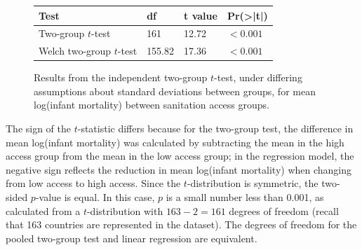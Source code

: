 

\begin{figure}[ht]
	\centering
	\begin{tabular}{llll}
		\hline
		Test & df & t value & Pr(>|t|) \\ 
		\hline
		Two-group $t$-test & 161 & 12.72 & $< 0.001$ \\ 
		Welch two-group $t$-test & 155.82 & 17.36 & $< 0.001$ \\
		\hline
	\end{tabular}
	\caption{Results from the independent two-group $t$-test, under differing assumptions about standard deviations between groups, for mean log(infant mortality) between sanitation access groups.} 
	\label{tTestSanitStd}
\end{figure}



The sign of the $t$-statistic differs because for the two-group test, the difference in mean log(infant mortality) was calculated by subtracting the mean in the high access group from the mean in the low access group; in the regression model, the negative sign reflects the reduction in mean log(infant mortality) when changing from low access to high access. Since the $t$-distribution is symmetric, the two-sided $p$-value is equal. In this case, $p$ is a small number less than 0.001, as calculated from a $t$-distribution with $163-2 = 161$ degrees of freedom (recall that 163 countries are represented in the dataset). The degrees of freedom for the pooled two-group test and linear regression are equivalent.

